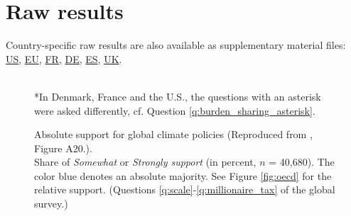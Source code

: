 \documentclass[12pt,english]{article}
\begin{document}
 

\clearpage
\section{Raw results%
}\label{app:raw_results}

Country-specific raw results are also available as supplementary material files:  \href{https://github.com/bixiou/international_attitudes_toward_global_policies/raw/main/paper/app_desc_stats_US.pdf}{US}, \href{https://github.com/bixiou/international_attitudes_toward_global_policies/raw/main/paper/app_desc_stats_EU.pdf}{EU}, \href{https://github.com/bixiou/international_attitudes_toward_global_policies/raw/main/paper/app_desc_stats_FR.pdf}{FR}, \href{https://github.com/bixiou/international_attitudes_toward_global_policies/raw/main/paper/app_desc_stats_DE.pdf}{DE}, \href{https://github.com/bixiou/international_attitudes_toward_global_policies/raw/main/paper/app_desc_stats_ES.pdf}{ES}, \href{https://github.com/bixiou/international_attitudes_toward_global_policies/raw/main/paper/app_desc_stats_UK.pdf}{UK}.

\begin{figure}[h!]
    \caption[Absolute support for global climate policies]{Absolute support for global climate policies (Reproduced from \citealp{dechezlepretre_fighting_2022}, Figure A20.). %
    \\ Share of \textit{Somewhat} or \textit{Strongly support} (in percent, $n$ = 40,680). The color blue denotes an absolute majority. See Figure \ref{fig:oecd} for the relative support. (Questions \ref{q:scale}-\ref{q:millionaire_tax} of the global survey.)%
    } 
    \label{fig:oecd_absolute}%
    {\footnotesize \\ *In Denmark, France and the U.S., the questions with an asterisk were asked differently, cf. Question \ref{q:burden_sharing_asterisk}. } 
\end{figure}
\end{document}
